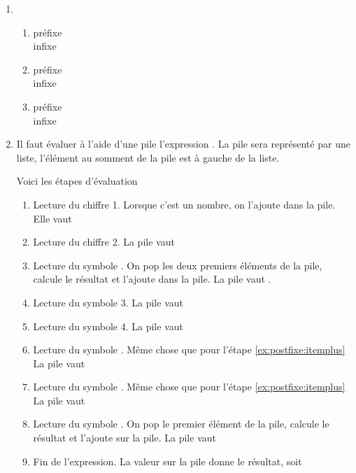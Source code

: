 \begin{Answer}[ref={ex:postfixe}]
  \begin{enumerate}
        \item
\begin{enumerate}[1.]
\item \begin{description}
  \item[préfixe]
  \item[infixe]
    \end{description}
\item \begin{description}
  \item[préfixe]
  \item[infixe]
    \end{description}
\item \begin{description}
  \item[préfixe]
  \item[infixe]
    \end{description}
  \end{enumerate}

\item

  Il faut évaluer à l'aide d'une pile l'expression .
  La pile sera représenté par une liste,
  l'élément au somment de la pile est à gauche de la liste.

  Voici les étapes d'évaluation
  \begin{enumerate}[1.]
  \item Lecture du chiffre 1. Lorsque c'est un nombre, on l'ajoute dans la pile. Elle vaut \codeinline{[1]}
  \item Lecture du chiffre 2. La pile vaut \codeinline{[2, 1]}
  \item \label{ex:postfixe:itemplus} Lecture du symbole \codeinline{+}. On pop les deux premiers éléments de la pile, calcule le résultat et l'ajoute dans la pile. La pile vaut \codeinline{[3]}.
  \item Lecture du symbole 3. La pile vaut \codeinline{[3, 3]}
  \item Lecture du symbole 4. La pile vaut \codeinline{[4, 3, 3]}
  \item Lecture du symbole \codeinline{*}. Même chose que pour l'étape {\ref{ex:postfixe:itemplus}} La pile vaut \codeinline{[12, 3]}
  \item Lecture du symbole \codeinline{==}. Même chose que pour l'étape {\ref{ex:postfixe:itemplus}} La pile vaut \codeinline{[False]}
  \item Lecture du symbole . On pop le premier élément de la pile, calcule le résultat et l'ajoute sur la pile. La pile vaut \codeinline{[True]}
  \item Fin de l'expression. La valeur sur la pile donne le résultat, soit 
  \end{enumerate}
  
  
\end{enumerate}
\end{Answer}